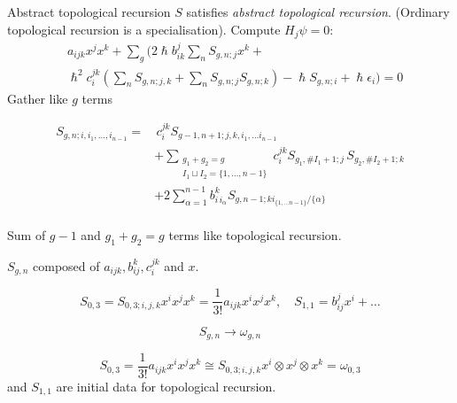     \begin{frame}{Abstract topological recursion}
        \(S\) satisfies \emph{abstract topological recursion}. (Ordinary topological recursion is a specialisation). Compute \(H_j \psi = 0\):
        \begin{align*}
            & a_{ijk} x^j x^k + \sum_g \bigg( 2 \hslash b_{ik}^{j} \sum_n  S_{g,n;j} x^k + \\
            &\hslash^2 c_i^{jk}  \left(\sum_n S_{g,n;j,k} + \sum_n S_{g,n;j} S_{g,n;k} \right) - \hslash S_{g,n;i} + \hslash \epsilon_i \bigg)  = 0
        \end{align*}
        Gather like \(g\) terms \trightarrow{}
    \end{frame}

    \begin{frame}{}
    \begin{defn}
    \begin{align*}
        S_{g,n;i,i_1,\dots,i_{n-1}} =&  \, c^{jk}_i S_{g-1,n+1;j,k,i_1, \dots i_{n-1}} \\
        &+ \sum_{\substack{g_1 + g_2 = g \\ I_1 \sqcup I_2 = \{1, \dots, n-1\}} } c^{jk}_i S_{g_1, \# I_1 + 1; j}\, S_{g_2, \# I_2+1;k}  \\    
        &+ 2 \sum_{\alpha = 1 }^{n-1} b^k_{i \, i_\alpha} S_{g,n-1;k i_{\{1,\dots n-1\}}/\{\alpha\}}  \\ 
        & 
    \end{align*}
    \end{defn}
    Sum of \(g-1\) and \(g_1+g_2 = g\) terms like topological recursion.
    \end{frame}

    \begin{frame}{}
    \(S_{g,n}\) composed of \(a_{ijk},b_{ij}^k, c_{i}^{jk}\) and \(x\).
    \begin{ex}
    \[ S_{0,3} = S_{0,3;i,j,k}x^i x^j x^k = \frac{1}{3!} a_{ijk}x^i x^j x^k , \quad S_{1,1} = b_{ij}^j x^i + \dots  \]
    \end{ex}
    \end{frame}
    
    
    
    \begin{frame}{}
    \Large \[ S_{g,n} \rightarrow \omega_{g,n}\]
    \end{frame}
    
    \begin{frame}
    \[S_{0,3} = \frac{1}{3!} a_{ijk} x^i x^j x^k \cong S_{0,3;i,j,k} x^i \otimes x^j \otimes x^k = \omega_{0,3} \] 
    and \(S_{1,1}\) are initial data for topological recursion.        
    \end{frame}

    
    